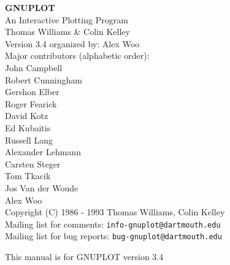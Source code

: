 %
%
\ifx\undefined\selectfont %
\else
{}
\fi
\setlength{\textwidth}{6.25in}
\setlength{\oddsidemargin}{0.5cm}
\setlength{\topmargin}{-0.5in}
\setlength{\textheight}{9in}
\setlength{\parskip}{1ex}
\setlength{\parindent}{0pt}
\adjustarticle
\setlength{\threenum}{4.0em} %


\pagestyle{empty}
   \rule{0in}{3in}
   \begin{center}
   {\huge\bf GNUPLOT}\\
   \vspace{3ex}
   {\Large An Interactive Plotting Program}\\
   \vspace{2ex}
   \large
   Thomas Williams \& Colin Kelley\\
   \vspace{2ex}
   Version 3.4 organized by: Alex Woo \\
   Major contributors (alphabetic order):\\
  John Campbell\\
  Robert Cunningham\\
  Gershon Elber\\
  Roger Fearick\\
  David Kotz\\
  Ed Kubaitis\\
  Russell Lang\\
  Alexander Lehmann\\
  Carsten Steger\\
  Tom Tkacik\\
  Jos Van der Woude \\
  Alex Woo\\
  Copyright (C) 1986 - 1993   Thomas Williams, Colin Kelley\\
   \vspace{3ex}
   Mailing list for comments: \verb+info-gnuplot@dartmouth.edu+\\
   Mailing list for bug reports: \verb+bug-gnuplot@dartmouth.edu+

   \vfill
   {\small This manual is for GNUPLOT version 3.4\\
   }

   \end{center}
\newpage

\tableofcontents
\newpage

\setcounter{page}{1}
\pagestyle{myheadings}
